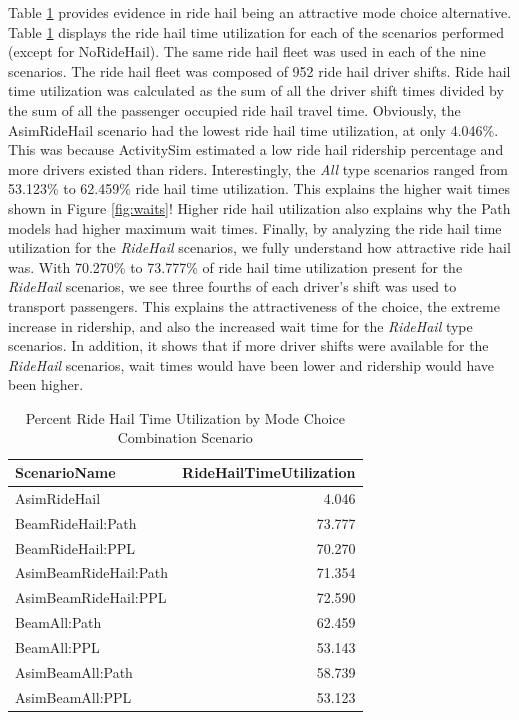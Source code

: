 \documentclass[fancy, masters]{byuthesis}
\begin{document}
Table \ref{tab:timeutil} provides evidence in ride hail being an attractive mode choice alternative. Table \ref{tab:timeutil} displays the ride hail time utilization for each of the scenarios performed (except for NoRideHail). The same ride hail fleet was used in each of the nine scenarios. The ride hail fleet was composed of 952 ride hail driver shifts. Ride hail time utilization was calculated as the sum of all the driver shift times divided by the sum of all the passenger occupied ride hail travel time. Obviously, the AsimRideHail scenario had the lowest ride hail time utilization, at only 4.046\%. This was because ActivitySim estimated a low ride hail ridership percentage and more drivers existed than riders. Interestingly, the \emph{All} type scenarios ranged from 53.123\% to 62.459\% ride hail time utilization. This explains the higher wait times shown in Figure \ref{fig:waits}! Higher ride hail utilization also explains why the Path models had higher maximum wait times. Finally, by analyzing the ride hail time utilization for the \emph{RideHail} scenarios, we fully understand how attractive ride hail was. With 70.270\% to 73.777\% of ride hail time utilization present for the \emph{RideHail} scenarios, we see three fourths of each driver's shift was used to transport passengers. This explains the attractiveness of the choice, the extreme increase in ridership, and also the increased wait time for the \emph{RideHail} type scenarios. In addition, it shows that if more driver shifts were available for the \emph{RideHail} scenarios, wait times would have been lower and ridership would have been higher.

\begin{table}

\caption{\label{tab:timeutil}Percent Ride Hail Time Utilization by Mode Choice Combination Scenario}
\centering
\begin{tabular}[t]{lr}
\toprule
ScenarioName & RideHailTimeUtilization\\
\midrule
AsimRideHail & 4.046\\
BeamRideHail:Path & 73.777\\
BeamRideHail:PPL & 70.270\\
AsimBeamRideHail:Path & 71.354\\
AsimBeamRideHail:PPL & 72.590\\
\addlinespace
BeamAll:Path & 62.459\\
BeamAll:PPL & 53.143\\
AsimBeamAll:Path & 58.739\\
AsimBeamAll:PPL & 53.123\\
\bottomrule
\end{tabular}
\end{table}
\end{document}
